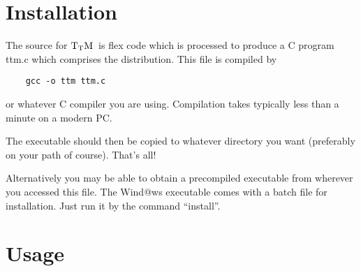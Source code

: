 \documentclass[12pt]{article}
\def\TtM{$\rm{}T_TH$}
\def\TtM{$\rm{}T_TM$}%
\begin{document}
\section{Installation}

The source for \TtM\ is flex code which is processed to produce a C program
ttm.c which comprises the distribution. This file is compiled by
{\begin{verbatim}
	gcc -o ttm ttm.c
\end{verbatim} }
\noindent or whatever C compiler you are using. Compilation takes
typically less than a minute on a modern PC. 

The executable should then be copied to whatever directory you want
(preferably on your path of course). That's all! 

Alternatively you may be able to obtain a precompiled executable from
wherever you accessed this file. The Wind@ws executable comes with a
batch file for installation. Just run it by the command ``install''.

\section{Usage}
\end{document}
